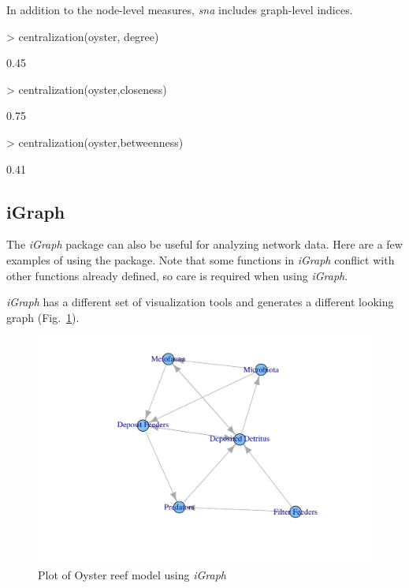 \documentclass[11pt]{article}
\begin{document}
In addition to the node-level measures, \textit{sna} includes graph-level
indices.  

\begin{Schunk}
\begin{Sinput}
> centralization(oyster, degree)
\end{Sinput}
\begin{Soutput}
[1] 0.45
\end{Soutput}
\begin{Sinput}
> centralization(oyster,closeness)
\end{Sinput}
\begin{Soutput}
[1] 0.75
\end{Soutput}
\begin{Sinput}
> centralization(oyster,betweenness)
\end{Sinput}
\begin{Soutput}
[1] 0.41
\end{Soutput}
\end{Schunk}

\subsection{iGraph}
The \textit{iGraph} package can also be useful for analyzing network
data.  Here are a few examples of using the package.  Note that some
functions in \textit{iGraph} conflict with other functions already defined, so
care is required when using \textit{iGraph}.

\begin{Schunk}
\end{Schunk}

\textit{iGraph} has a different set of visualization tools and
generates a different looking graph (Fig.~\ref{fig:igraph}).

\begin{figure}
\center
\includegraphics{enaR-054}
\caption{Plot of Oyster reef model using \textit{iGraph}}\label{fig:igraph}
\end{figure}
\end{document}
